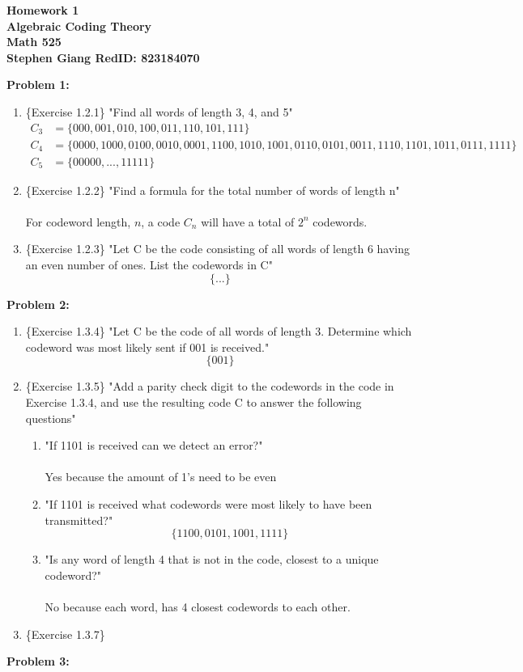\documentclass[11pt]{article}
\newenvironment{problem}[1]{\textbf{Problem #1: }}{\newpage}
\begin{document}
	
	\begin{center}
		\textbf{Homework 1} \\
		\textbf{Algebraic Coding Theory} \\
		\textbf{Math 525} \\
		\textbf{Stephen Giang RedID: 823184070} \\
	\end{center}

	\begin{problem}{1}
		\begin{enumerate}
			\item \{Exercise 1.2.1\}
			"Find all words of length 3, 4, and 5"
			\begin{align*}
				C_3 &= \{000, 
						001, 010, 100, 
						011, 110, 101,
						111\} \\
				C_4 &= \{0000, 
						1000, 0100, 0010, 0001,
						1100, 1010, 1001, 0110, 0101, 0011, 
						1110, 1101, 1011, 0111,
						1111\} \\
				C_5 &= \{00000, ..., 11111\}
			\end{align*}
			\item \{Exercise 1.2.2\}
			"Find a formula for the total number of words of length n"
			\\ \\
			 For codeword length, $n$, a code $C_n$ will have a total of $2^n$ codewords.
			 \item \{Exercise 1.2.3\}
			"Let C be the code consisting of all words of length 6 having an even number of ones. List the codewords in C"
			 \[\{...\}\]
		\end{enumerate}
	\end{problem}
	
	\begin{problem}{2}
		\begin{enumerate}
			\item \{Exercise 1.3.4\} 
			"Let C be the code of all words of length 3. Determine which codeword was most likely sent if 001 is received."
			\[\{001\}\]
			\item \{Exercise 1.3.5\}
			"Add a parity check digit to the codewords in the code in Exercise 1.3.4, and use the resulting code C to answer the following questions"
			\begin{enumerate}[label = (\alph*)]
				\item "If 1101 is received can we detect an error?"
				 \\ \\
				 Yes because the amount of 1's need to be even
				 \item "If 1101 is received what codewords were most likely to have been transmitted?"
				 \[\{1100, 0101, 1001, 1111\}\]
				 \item "Is any word of length 4 that is not in the code, closest to a unique codeword?"
				 \\ \\
				 No because each word, has 4 closest codewords to each other.
			\end{enumerate} 
			\item \{Exercise 1.3.7\}
			
		\end{enumerate}
	\end{problem}

	\begin{problem}{3}
		
	\end{problem}
\end{document}
